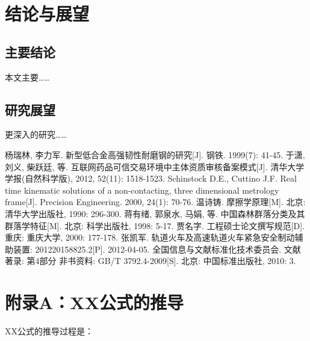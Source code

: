 \documentclass[UTF8,a4paper,12pt]{ctexart}
\numberwithin{equation}{section}
\begin{document}
\newpage
{}
\section{结论与展望}

\subsection{主要结论}
本文主要……

\subsection{研究展望}
更深入的研究……

\newpage
{}

\renewcommand\refname{参考文献}


\begin{thebibliography}{1}
\setlength{\itemsep}{0pt}
 杨瑞林, 李力军. 新型低合金高强韧性耐磨钢的研究[J]. 钢铁. 1999(7): 41-45.
 于潇, 刘义, 柴跃廷, 等. 互联网药品可信交易环境中主体资质审核备案模式[J]. 清华大学学报(自然科学版), 2012, 52(11): 1518-1523.
 Schinstock D.E., Cuttino J.F. Real time kinematic solutions of a non-contacting, three dimensional metrology frame[J]. Precision Engineering. 2000, 24(1): 70-76. 
 温诗铸. 摩擦学原理[M]. 北京: 清华大学出版社, 1990: 296-300.
 蒋有绪, 郭泉水, 马娟, 等. 中国森林群落分类及其群落学特征[M]. 北京: 科学出版社, 1998: 5-17.
 贾名字. 工程硕士论文撰写规范[D]. 重庆: 重庆大学, 2000: 177-178.
 张凯军. 轨道火车及高速轨道火车紧急安全制动辅助装置: 201220158825.2[P]. 2012-04-05.
 全国信息与文献标准化技术委员会. 文献著录: 第4部分 非书资料: GB/T 3792.4-2009[S]. 北京: 中国标准出版社, 2010: 3.
\end{thebibliography}

\newpage
{}

\section*{附录A：XX公式的推导}
XX公式的推导过程是：
\end{document}
